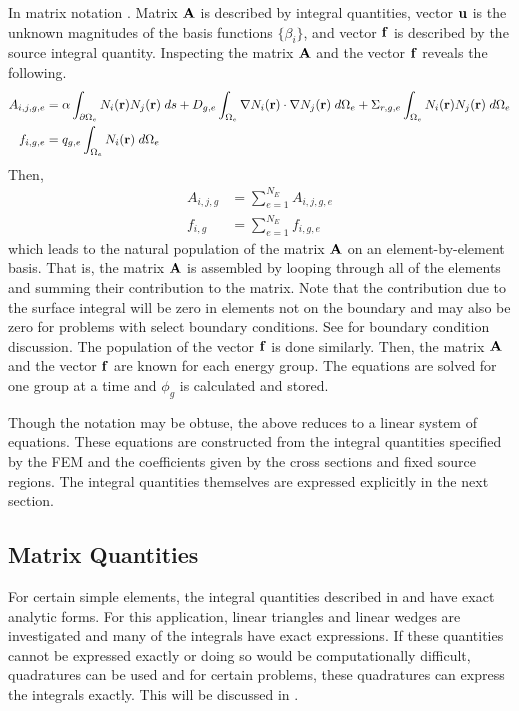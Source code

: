     In matrix notation . Matrix $\mathbf{A}$ is 
    described by integral quantities, vector $\mathbf{u}$ is the unknown magnitudes of
    the basis functions $\{\beta_i\}$, and vector $\mathbf{f}$ is described by the 
    source integral quantity. Inspecting the matrix $\mathbf{A}$ and the vector $\mathbf{f}$
    reveals the following.
    \begin{align}
      \label{eq:matrix_population}
      A_{i,j,g,e} &= \alpha \int_{\partial \Omega_e} N_i(\mathbf{r}) 
        N_j(\mathbf{r}) \; ds + D_{g,e} 
        \int_{\Omega_e} \mathbf{\nabla} N_i(\mathbf{r}) \cdot \mathbf{\nabla} N_j(\mathbf{r}) \;
        d\Omega_e + \Sigma_{r,g,e} \int_{\Omega_e} N_i(\mathbf{r}) N_j(\mathbf{r})
        \; d\Omega_e \\
      \label{eq:vector_population}
      f_{i,g,e} &= q_{g,e} \int_{\Omega_e} N_i(\mathbf{r}) \;d\Omega_e
    \end{align}
    Then, 
    \begin{align}
      A_{i,j,g} &= \sum_{e=1}^{N_E} A_{i,j,g,e} \\
      f_{i,g} &=  \sum_{e=1}^{N_E} f_{i,g,e}
    \end{align}
    which leads to the natural population of the matrix $\mathbf{A}$ on an 
    element-by-element basis. That is, the matrix $\mathbf{A}$ is assembled by looping
    through all of the elements and summing their contribution to the matrix. 
    Note that the contribution due to the surface integral will be zero in 
    elements not on the boundary and may also be zero for problems with select
    boundary conditions. See  for boundary
    condition discussion.  The population of the vector $\mathbf{f}$ is done similarly. 
    Then, the matrix $\mathbf{A}$ and the vector $\mathbf{f}$ are known for each energy group.
    The equations are solved for one group at a time and $\phi_g$ is calculated
    and stored.
    
    Though the notation may be obtuse, the above reduces to a linear system of
    equations. These equations are constructed from the integral quantities 
    specified by the FEM and the coefficients given by the cross sections and
    fixed source regions. The integral quantities themselves are expressed 
    explicitly in the next section.
    
  \subsection{Matrix Quantities}
    \label{sec:matrix_quantities}
    For certain simple elements, the integral quantities described in 
     and  have exact 
    analytic forms. For this application, linear triangles and linear wedges
    are investigated and many of the integrals have exact expressions. If these 
    quantities cannot be expressed exactly or doing so would be computationally
    difficult, quadratures can be used and for certain problems, these 
    quadratures can express the integrals exactly. This will be discussed in 
    .
